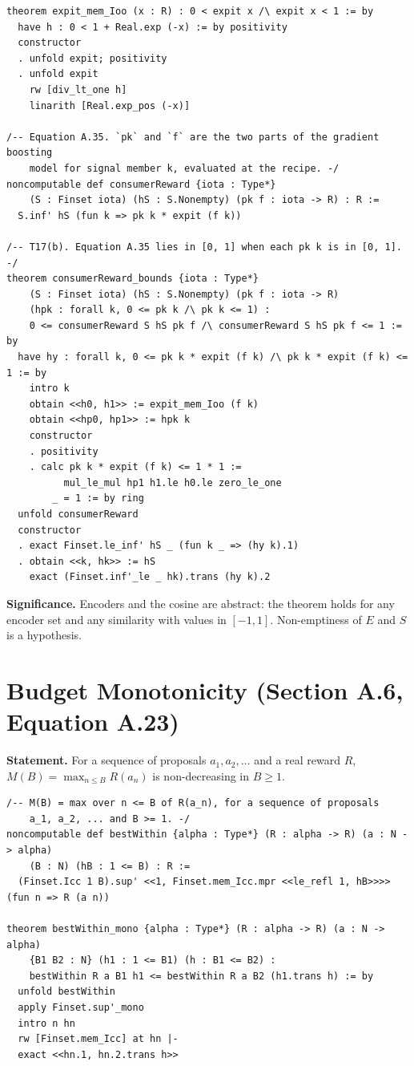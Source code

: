 \documentclass[11pt,a4paper]{article}
\begin{document}
\begin{lstlisting}
theorem expit_mem_Ioo (x : R) : 0 < expit x /\ expit x < 1 := by
  have h : 0 < 1 + Real.exp (-x) := by positivity
  constructor
  . unfold expit; positivity
  . unfold expit
    rw [div_lt_one h]
    linarith [Real.exp_pos (-x)]

/-- Equation A.35. `pk` and `f` are the two parts of the gradient boosting
    model for signal member k, evaluated at the recipe. -/
noncomputable def consumerReward {iota : Type*}
    (S : Finset iota) (hS : S.Nonempty) (pk f : iota -> R) : R :=
  S.inf' hS (fun k => pk k * expit (f k))

/-- T17(b). Equation A.35 lies in [0, 1] when each pk k is in [0, 1]. -/
theorem consumerReward_bounds {iota : Type*}
    (S : Finset iota) (hS : S.Nonempty) (pk f : iota -> R)
    (hpk : forall k, 0 <= pk k /\ pk k <= 1) :
    0 <= consumerReward S hS pk f /\ consumerReward S hS pk f <= 1 := by
  have hy : forall k, 0 <= pk k * expit (f k) /\ pk k * expit (f k) <= 1 := by
    intro k
    obtain <<h0, h1>> := expit_mem_Ioo (f k)
    obtain <<hp0, hp1>> := hpk k
    constructor
    . positivity
    . calc pk k * expit (f k) <= 1 * 1 :=
          mul_le_mul hp1 h1.le h0.le zero_le_one
        _ = 1 := by ring
  unfold consumerReward
  constructor
  . exact Finset.le_inf' hS _ (fun k _ => (hy k).1)
  . obtain <<k, hk>> := hS
    exact (Finset.inf'_le _ hk).trans (hy k).2
\end{lstlisting}

	\noindent\textbf{Significance.} Encoders and the cosine are abstract: the theorem holds for any encoder set and any similarity with values in $[-1,1]$. Non-emptiness of $E$ and $S$ is a hypothesis.

	\section{Budget Monotonicity (Section A.6, Equation A.23)}

	\textbf{Statement.} For a sequence of proposals $a_1,a_2,\dots$ and a real reward $R$, $M(B)=\max_{n\le B}R(a_n)$ is non-decreasing in $B\ge 1$.

\begin{lstlisting}
/-- M(B) = max over n <= B of R(a_n), for a sequence of proposals
    a_1, a_2, ... and B >= 1. -/
noncomputable def bestWithin {alpha : Type*} (R : alpha -> R) (a : N -> alpha)
    (B : N) (hB : 1 <= B) : R :=
  (Finset.Icc 1 B).sup' <<1, Finset.mem_Icc.mpr <<le_refl 1, hB>>>> (fun n => R (a n))

theorem bestWithin_mono {alpha : Type*} (R : alpha -> R) (a : N -> alpha)
    {B1 B2 : N} (h1 : 1 <= B1) (h : B1 <= B2) :
    bestWithin R a B1 h1 <= bestWithin R a B2 (h1.trans h) := by
  unfold bestWithin
  apply Finset.sup'_mono
  intro n hn
  rw [Finset.mem_Icc] at hn |-
  exact <<hn.1, hn.2.trans h>>
\end{lstlisting}
\end{document}
